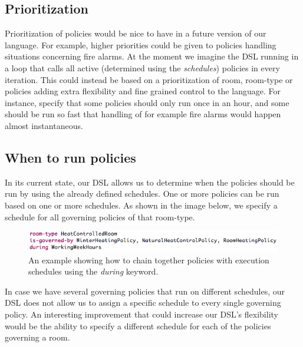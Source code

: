 \subsection{Prioritization}\label{subsec:looptime}
Prioritization of policies would be nice to have in a future version of our language. For example, higher priorities could be given to policies handling situations concerning fire alarms. At the moment we imagine the DSL running in a loop that calls all active (determined using the \textit{schedules}) policies in every iteration. This could instead be based on a prioritization of room, room-type or policies adding extra flexibility and fine grained control to the language. For instance, specify that some policies should only run once in an hour, and some should be run so fast that handling of for example fire alarms would happen almost instantaneous. 

\subsection{When to run policies}\label{subsec:during}
In its current state, our DSL allows us to determine when the policies should be run by using the already defined schedules. One or more policies can be run based on one or more schedules. As shown in the image below, we specify a schedule for all governing policies of that room-type. 
\begin{figure}
  \centering
    \includegraphics[scale=0.5]{dsl-during.png} 
	\caption{An example showing how to chain together policies with execution schedules using the \textit{during} keyword.}
	\label{fig:during}
\end{figure}
In case we have several governing policies that run on different schedules, our DSL does not allow us to assign a specific schedule to every single governing policy. An interesting improvement that could increase our DSL's flexibility would be the ability to specify a different schedule for each of the policies governing a room.